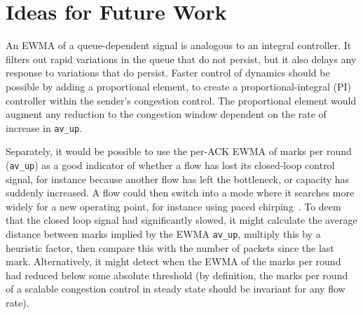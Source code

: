\section{Ideas for Future Work}\label{prresp_future}

An EWMA of a queue-dependent signal is analogous to an integral controller. It
filters out rapid variations in the queue that do not persist, but it also
delays any response to variations that do persist. Faster control of dynamics
should be possible by adding a proportional element, to create a
proportional-integral (PI) controller within the sender's congestion control.
The proportional element would augment any reduction to the congestion window
dependent on the rate of increase in \texttt{av\_up}.

Separately, it would be possible to use the per-ACK EWMA of marks per round
(\texttt{av\_up}) as a good indicator of whether a flow has lost its closed-loop
control signal, for instance because another flow has left the bottleneck, or
capacity has suddenly increased. A flow could then switch into a mode where it
searches more widely for a new operating point, for instance using paced
chirping~\cite[\S\,3]{Misund19a:Paced_Chirping_Linux}. To deem that the closed
loop signal had significantly slowed, it might calculate the average distance
between marks implied by the EWMA \texttt{av\_up}, multiply this by a heuristic
factor, then compare this with the number of packets since the last mark.
Alternatively, it might detect when the EWMA of the marks per round had reduced
below some absolute threshold (by definition, the marks per round of a scalable
congestion control in steady state should be invariant for any flow rate).
